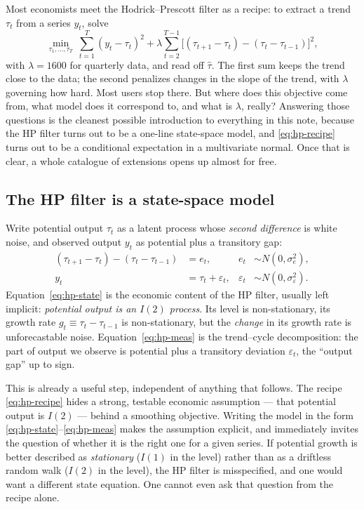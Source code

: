 \documentclass[11pt]{article}
\begin{document}
Most economists meet the Hodrick--Prescott filter as a recipe: to
extract a trend $\tau_t$ from a series $y_t$, solve
\begin{equation}
\min_{\tau_1,\dots,\tau_T}\ \sum_{t=1}^{T}(y_t-\tau_t)^2
   + \lambda \sum_{t=2}^{T-1}\bigl[(\tau_{t+1}-\tau_t)-(\tau_t-\tau_{t-1})\bigr]^2,
\label{eq:hp-recipe}
\end{equation}
with $\lambda=1600$ for quarterly data, and read off $\widehat\tau$.
The first sum keeps the trend close to the data; the second penalizes
changes in the slope of the trend, with $\lambda$ governing how hard.
Most users stop there.  But where does this objective come from, what
model does it correspond to, and what is $\lambda$, really?  Answering
those questions is the cleanest possible introduction to everything in
this note, because the HP filter turns out to be a one-line state-space
model, and \eqref{eq:hp-recipe} turns out to be a conditional
expectation in a multivariate normal.  Once that is clear, a whole
catalogue of extensions opens up almost for free.

\subsection{The HP filter is a state-space model}

Write potential output $\tau_t$ as a latent process whose
\emph{second difference} is white noise, and observed output $y_t$ as
potential plus a transitory gap:
\begin{align}
(\tau_{t+1}-\tau_t)-(\tau_t-\tau_{t-1}) &= e_t, & e_t &\sim N(0,\sigma_e^2),
\label{eq:hp-state}\\
y_t &= \tau_t + \varepsilon_t, & \varepsilon_t &\sim N(0,\sigma_\varepsilon^2).
\label{eq:hp-meas}
\end{align}
Equation~\eqref{eq:hp-state} is the economic content of the HP filter,
usually left implicit: \emph{potential output is an $I(2)$ process}.
Its level is non-stationary, its growth rate $g_t\equiv\tau_t-\tau_{t-1}$
is non-stationary, but the \emph{change} in its growth rate is
unforecastable noise.  Equation~\eqref{eq:hp-meas} is the trend--cycle
decomposition: the part of output we observe is potential plus a
transitory deviation $\varepsilon_t$, the ``output gap'' up to sign.

This is already a useful step, independent of anything that follows.
The recipe \eqref{eq:hp-recipe} hides a strong, testable economic
assumption --- that potential output is $I(2)$ --- behind a smoothing
objective.  Writing the model in the form \eqref{eq:hp-state}--\eqref{eq:hp-meas}
makes the assumption explicit, and immediately invites the question of
whether it is the right one for a given series.  If potential growth
is better described as \emph{stationary} ($I(1)$ in the level) rather
than as a driftless random walk ($I(2)$ in the level), the HP filter is
misspecified, and one would want a different state equation.  One cannot
even ask that question from the recipe alone.
\end{document}
